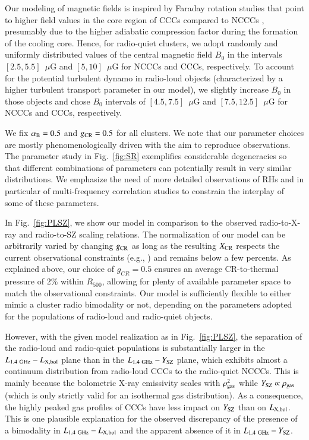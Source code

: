 \documentclass[useAMS,usenatbib]{mn2e}
\begin{document}
Our modeling of magnetic fields is inspired by Faraday rotation studies that
point to higher field values in the core region of CCCs compared to NCCCs
\citep{2011A&A...529A..13K, 2010A&A...513A..30B}, presumably due to the higher
adiabatic compression factor during the formation of the cooling core. Hence,
for radio-quiet clusters, we adopt randomly and uniformly distributed values of
the central magnetic field $B_0$ in the intervals $[2.5,5.5]$~$\mu$G and
$[5,10]$~$\mu$G for NCCCs and CCCs, respectively. To account for the potential
turbulent dynamo in radio-loud objects (characterized by a higher turbulent
transport parameter in our model), we slightly increase $B_0$ in those objects
and chose $B_0$ intervals of $[4.5,7.5]$~$\mu$G and $[7.5,12.5]$~$\mu$G for
NCCCs and CCCs, respectively.

We fix $\alpha_{{\mathrm{B}}}=0.5$ and $g_{{\mathrm{CR}}}=0.5$ for all clusters. We note
that our parameter choices are mostly phenomenologically driven with the aim to
reproduce observations. The parameter study in Fig.~\ref{fig:SR} exemplifies
considerable degeneracies so that different combinations of parameters can
potentially result in very similar distributions. We emphasize the need of more
detailed observations of RHs and in particular of multi-frequency
correlation studies to constrain the interplay of some of these parameters.

In Fig.~\ref{fig:PLSZ}, we show our model in comparison to the observed
radio-to-X-ray and radio-to-SZ scaling relations. The normalization of our model
can be arbitrarily varied by changing $g_{{\mathrm{CR}}}$ as long as the resulting
$X_{{\mathrm{CR}}}$ respects the current observational constraints
(e.g., \citealp{2011arXiv1111.5544M}) and remains below a few percents. As
explained above, our choice of $g_{CR}=0.5$ ensures an average CR-to-thermal
pressure of $2\%$ within $R_{500}$, allowing for plenty of available parameter
space to match the observational constraints.  Our model is sufficiently
flexible to either mimic a cluster radio bimodality or not, depending on the
parameters adopted for the populations of radio-loud and radio-quiet
objects. 

However, with the given model realization as in Fig.~\ref{fig:PLSZ}, the
separation of the radio-loud and radio-quiet populations is substantially larger in
the $L_{1.4~{\mathrm{GHz}}}-L_{{\mathrm{X,bol}}}$ plane than in the
$L_{1.4~{\mathrm{GHz}}}-Y_{{\mathrm{SZ}}}$ plane, which exhibits almost a continuum
distribution from radio-loud CCCs to the radio-quiet NCCCs. This is mainly
because the bolometric X-ray emissivity scales with $\rho_{{\mathrm{gas}}}^2$ while
$Y_{{\mathrm{SZ}}}\propto\rho_{{\mathrm{gas}}}$ (which is only strictly valid for an
isothermal gas distribution). As a consequence, the highly peaked gas profiles
of CCCs have less impact on $Y_{{\mathrm{SZ}}}$ than on $L_{{\mathrm{X,bol}}}$. This is
one plausible explanation for the observed discrepancy of the presence of a
bimodality in $L_{1.4~{\mathrm{GHz}}}-L_{{\mathrm{X,bol}}}$ and the apparent absence of it
in $L_{1.4~{\mathrm{GHz}}}-Y_{{\mathrm{SZ}}}$. 
\end{document}
